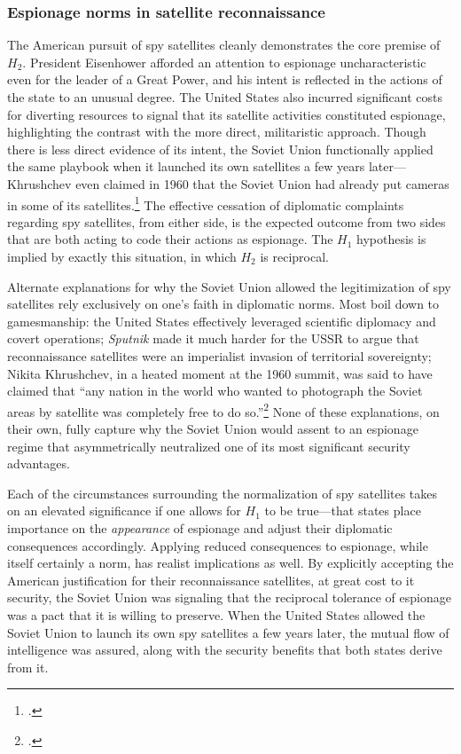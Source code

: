 \documentclass[14pt]{extarticle}
\begin{document}
\subsubsection{Espionage norms in satellite reconnaissance}
The American pursuit of spy satellites cleanly demonstrates the core premise of $H_2$. President Eisenhower afforded an attention to espionage uncharacteristic even for the leader of a Great Power, and his intent is reflected in the actions of the state to an unusual degree. The United States also incurred significant costs for diverting resources to signal that its satellite activities constituted espionage, highlighting the contrast with the more direct, militaristic approach. Though there is less direct evidence of its intent, the Soviet Union functionally applied the same playbook when it launched its own satellites a few years later---Khrushchev even claimed in 1960 that the Soviet Union had already put cameras in some of its satellites.\footcite[p.~353. As far as we know, these camera-equipped satellites, if they actually existed, were not successful enough to be considered spy satellites.]{brugioni_eyes_2010} The effective cessation of diplomatic complaints regarding spy satellites, from either side, is the expected outcome from two sides that are both acting to code their actions as espionage. The $H_1$ hypothesis is implied by exactly this situation, in which $H_2$ is reciprocal.

Alternate explanations for why the Soviet Union allowed the legitimization of spy satellites rely exclusively on one's faith in diplomatic norms. Most boil down to gamesmanship: the United States effectively leveraged scientific diplomacy and covert operations; \emph{Sputnik} made it much harder for the USSR to argue that reconnaissance satellites were an imperialist invasion of territorial sovereignty; Nikita Khrushchev, in a heated moment at the 1960 summit, was said to have claimed that ``any nation in the world who wanted to photograph the Soviet areas by satellite was completely free to do so.''\footcite[p.~556]{eisenhower_waging_1965} None of these explanations, on their own, fully capture why the Soviet Union would assent to an espionage regime that asymmetrically neutralized one of its most significant security advantages.

Each of the circumstances surrounding the normalization of spy satellites takes on an elevated significance if one allows for $H_1$ to be true---that states place importance on the \emph{appearance} of espionage and adjust their diplomatic consequences accordingly. Applying reduced consequences to espionage, while itself certainly a norm, has realist implications as well. By explicitly accepting the American justification for their reconnaissance satellites, at great cost to it security, the Soviet Union was signaling that the reciprocal tolerance of espionage was a pact that it is willing to preserve. When the United States allowed the Soviet Union to launch its own spy satellites a few years later, the mutual flow of intelligence was assured, along with the security benefits that both states derive from it.
\end{document}
